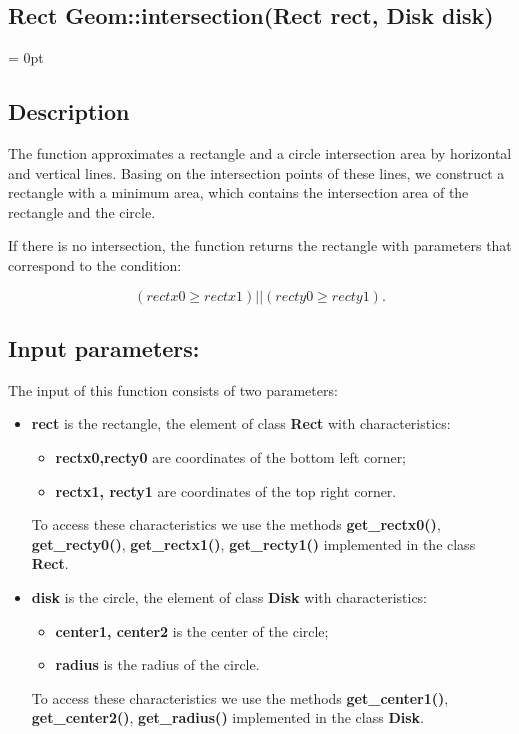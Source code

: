 \documentclass{report}
\begin{document}
	
	\begin{center} 
		\section*{Rect Geom::intersection(Rect rect, Disk disk)}
	\end{center}
	\parindent = 0pt
	\subsection*{Description}
	
	The function approximates a rectangle and a circle intersection area by horizontal and vertical lines. Basing on the intersection points of these lines, we construct a rectangle with a minimum area, which contains the intersection area of the rectangle and the circle.
	
	If there is no intersection, the function returns the rectangle with parameters that correspond to the condition: 
	
	\begin{equation}
		(rectx0 \ge rectx1) || (recty0 \ge recty1).
		\label{eq:cond1}
	\end{equation}
	
	\subsection*{Input parameters:}
	
	The input of this function consists of two parameters:
	
	\begin{itemize}
		\item {\bfseries	rect} is the rectangle, the element of class {\bfseries Rect} with characteristics:
		\begin{itemize}
			\item {\bfseries rectx0,recty0} are coordinates of the bottom left corner;
			\item {\bfseries rectx1, recty1} are coordinates of the top right corner.
		\end{itemize}
	
		To access these characteristics we use the methods  {\bfseries get\_rectx0()}, {\bfseries get\_recty0()}, {\bfseries get\_rectx1()}, {\bfseries get\_recty1()} implemented in the class {\bfseries Rect}.
		
		\item {\bfseries disk}  is the circle, the element of class {\bfseries Disk} with characteristics:
		\begin{itemize}
			\item {\bfseries center1, center2}  is the center of the circle;
			\item {\bfseries radius}  is  the radius of the circle.
		\end{itemize}
		
		To access these characteristics we use the methods {\bfseries get\_center1()}, {\bfseries get\_center2()}, {\bfseries get\_radius()} implemented in the class {\bfseries Disk}.
	\end{itemize}
	
\end{document}

